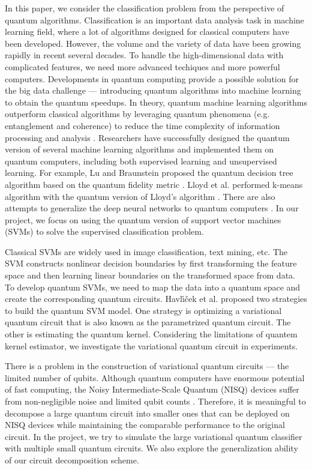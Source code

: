 \documentclass[sigconf]{acmart}
\begin{document}
In this paper, we consider the classification problem from the perspective of quantum algorithms. Classification is an important data analysis task in machine learning field, where a lot of algorithms designed for classical computers have been developed. However, the volume and the variety of data have been growing rapidly in recent several decades. To handle the high-dimensional data with complicated features, we need more advanced techiques and more powerful computers. Developments in quantum computing provide a possible solution for the big data challenge --- introducing quantum algorithms into machine learning to obtain the quantum speedups. In theory, quantum machine learning algorithms outperform classical algorithms by leveraging quantum phenomena (e.g. entanglement and coherence) to reduce the time complexity of information processing and analysis \cite{biamonte2017}. Researchers have successfully designed the quantum version of several machine learning algorithms and implemented them on quantum computers, including both supervised learning and unsupervised learning. For example, Lu and Braunstein proposed the quantum decision tree algorithm based on the quantum fidelity metric \cite{lu2013}. Lloyd et al. performed k-means algorithm with the quantum version of Lloyd’s algorithm \cite{lloyd2013}. There are also attempts to generalize the deep neural networks to quantum computers \cite{qnn2018}. In our project, we focus on using the quantum version of support vector machines (SVMs) to solve the supervised classification problem.

Classical SVMs are widely used in image classification, text mining, etc. The SVM constructs nonlinear decision boundaries by first transforming the feature space and then learning linear boundaries on the transformed space from data. To develop quantum SVMs, we need to map the data into a quantum space and create the corresponding quantum circuits. Havl{\'\i}{\v{c}}ek et al. \cite{havlivcek2019supervised} proposed two strategies to build the quantum SVM model. One strategy is optimizing a variational quantum circuit that is also known as the parametrized quantum circuit. The other is estimating the quantum kernel. Considering the limitations of quantem kernel estimator, we investigate the variational quantum circuit in experiments.

There is a problem in the construction of variational quantum circuits --- the limited number of qubits. Although quantum computers have enormous potential of fast computing, the Noisy Intermediate-Scale Quantum (NISQ) devices suffer from non-negligible noise and limited qubit counts \cite{tang2021}. Therefore, it is meaningful to decompose a large quantum circuit into smaller ones that can be deployed on NISQ devices while maintaining the comparable performance to the original circuit. In the project, we try to simulate the large variational quantum classifier with multiple small quantum circuits. We also explore the generalization ability of our circuit decomposition scheme.
\end{document}
